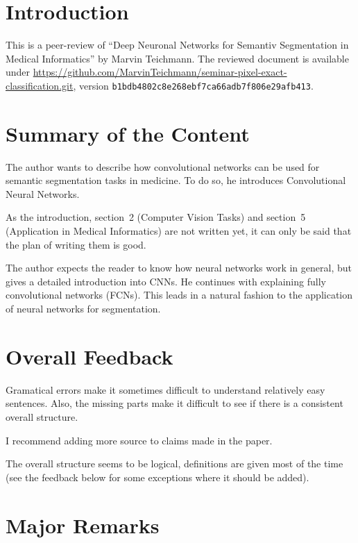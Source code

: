 \documentclass[a4paper,9pt]{scrartcl}
\title{\titletext}
\author{Martin Thoma}
\begin{document}
\maketitle
\section{Introduction}
This is a peer-review of \enquote{Deep Neuronal Networks for Semantiv
Segmentation in Medical Informatics} by Marvin Teichmann. The reviewed document
is available under \href{https://github.com/MarvinTeichmann/seminar-pixel-exact-classification.git}{https://github.com/MarvinTeichmann/seminar-pixel-exact-classification.git}, version
\texttt{b1bdb4802c8e268ebf7ca66adb7f806e29afb413}.

\section{Summary of the Content}
The author wants to describe how convolutional networks can be used for
semantic segmentation tasks in medicine. To do so, he introduces Convolutional
Neural Networks.

As the introduction, section~2 (Computer Vision Tasks) and section~5
(Application in Medical Informatics) are not written yet, it can only be said
that the plan of writing them is good.

The author expects the reader to know how neural networks work in general, but
gives a detailed introduction into CNNs. He continues with explaining fully
convolutional networks (FCNs). This leads in a natural fashion to the
application of neural networks for segmentation.


\section{Overall Feedback}
Gramatical errors make it sometimes difficult to understand relatively easy
sentences. Also, the missing parts make it difficult to see if there is a
consistent overall structure.

I recommend adding more source to claims made in the paper.

The overall structure seems to be logical, definitions are given most of the
time (see the feedback below for some exceptions where it should be added).


\section{Major Remarks}
\end{document}
